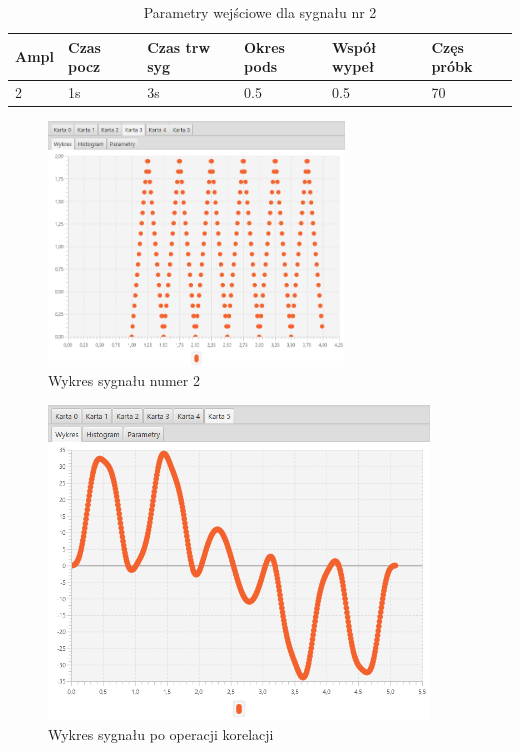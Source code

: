 \documentclass[12pt]{article}
\begin{document}
{{{                \begin{table}[H]
                    \centering
                    \begin{tabular}{|l|l|l|l|l|l|}
                        \hline
                        Ampl & Czas pocz & Czas trw syg & Okres pods & Współ wypeł & Częs próbk   \\\hline
                        2 & 1s & 3s & 0.5 & 0.5 & 70     \\\hline
                    \end{tabular}
                    \caption{Parametry wejściowe dla sygnału nr 2}
                \end{table}
                \begin{figure}[H]
                    \centering
                    \includegraphics[width=0.7\textwidth]{img/result/correlation/experiment3/data_124722.png}
                    \caption{Wykres sygnału numer 2}
                \end{figure}

                \begin{figure}[H]
                    \centering
                    \includegraphics[width=0.9\textwidth]{img/result/correlation/experiment3/data_124738.png}
                    \caption{Wykres sygnału po operacji korelacji}
                \end{figure}
            }
            \newpage
        }
}
\end{document}
